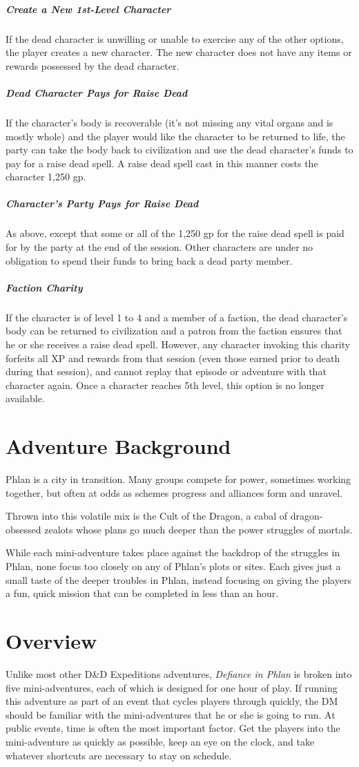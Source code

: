 \documentclass[10pt,a4paper,twoside,bg=print,twocolumn,openany,nodeprecatedcode]{dndbook}
\begin{document}
\subparagraph{Create a New 1st-Level Character}
If the dead character is unwilling or unable to exercise any of the other options, the player creates a new character. The new character does not have any items or rewards possessed by the dead character.

\subparagraph{Dead Character Pays for Raise Dead}
If the character's body is recoverable (it's not missing any vital organs and is mostly whole) and the player would like the character to be returned to life, the party can take the body back to civilization and use the dead character's funds to pay for a raise dead spell. A raise dead spell cast in this manner costs the character 1,250 gp.

\subparagraph{Character's Party Pays for Raise Dead}
As above, except that some or all of the 1,250 gp for the raise dead spell is paid for by the party at the end of the session. Other characters are under no obligation to spend their funds to bring back a dead party member.

\subparagraph{Faction Charity}
If the character is of level 1 to 4 and a member of a faction, the dead character's body can be returned to civilization and a patron from the faction ensures that he or she receives a raise dead spell. However, any character invoking this charity forfeits all XP and rewards from that session (even those earned prior to death during that session), and cannot replay that episode or adventure with that character again. Once a character reaches 5th level, this option is no longer available.

\section{Adventure Background}
Phlan is a city in transition. Many groups compete for power, sometimes working together, but often at odds as schemes progress and alliances form and unravel.

Thrown into this volatile mix is the Cult of the Dragon, a cabal of dragon-obsessed zealots whose plans go much deeper than the power struggles of mortals.

While each mini-adventure takes place against the backdrop of the struggles in Phlan, none focus too closely on any of Phlan's plots or sites. Each gives just a small taste of the deeper troubles in Phlan, instead focusing on giving the players a fun, quick mission that can be completed in less than an hour.

\section{Overview}
Unlike most other D\&D Expeditions adventures, \textit{Defiance in Phlan} is broken into five mini-adventures, each of which is designed for one hour of play. If running this adventure as part of an event that cycles players through quickly, the DM should be familiar with the mini-adventures that he or she is going to run. At public events, time is often the most important factor. Get the players into the mini-adventure as quickly as possible, keep an eye on the clock, and take whatever shortcuts are necessary to stay on schedule.
\end{document}
